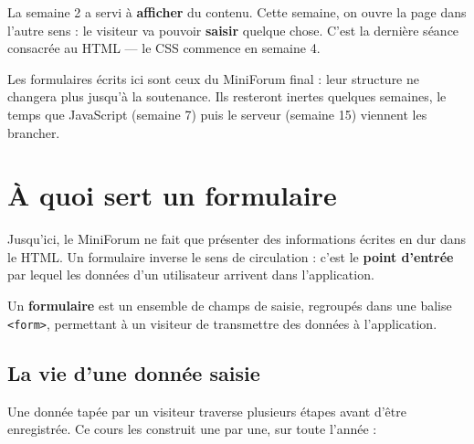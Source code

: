 \documentclass[a4paper,11pt]{article}
\begin{document}
\vspace{4pt}
\begin{tcolorbox}[astuce, title={Où en sommes-nous ?}]
La semaine 2 a servi à \textbf{afficher} du contenu. Cette semaine, on ouvre la page dans l'autre sens : le visiteur va pouvoir \textbf{saisir} quelque chose. C'est la dernière séance consacrée au HTML --- le CSS commence en semaine 4.

\vspace{3pt}
Les formulaires écrits ici sont ceux du MiniForum final : leur structure ne changera plus jusqu'à la soutenance. Ils resteront inertes quelques semaines, le temps que JavaScript (semaine 7) puis le serveur (semaine 15) viennent les brancher.
\end{tcolorbox}

\section{À quoi sert un formulaire}

Jusqu'ici, le MiniForum ne fait que présenter des informations écrites en dur dans le HTML. Un formulaire inverse le sens de circulation : c'est le \textbf{point d'entrée} par lequel les données d'un utilisateur arrivent dans l'application.

\begin{tcolorbox}[definition, title={Définition --- Formulaire}]
Un \textbf{formulaire} est un ensemble de champs de saisie, regroupés dans une balise \texttt{<form>}, permettant à un visiteur de transmettre des données à l'application.
\end{tcolorbox}

\subsection{La vie d'une donnée saisie}

Une donnée tapée par un visiteur traverse plusieurs étapes avant d'être enregistrée. Ce cours les construit une par une, sur toute l'année :
\end{document}
